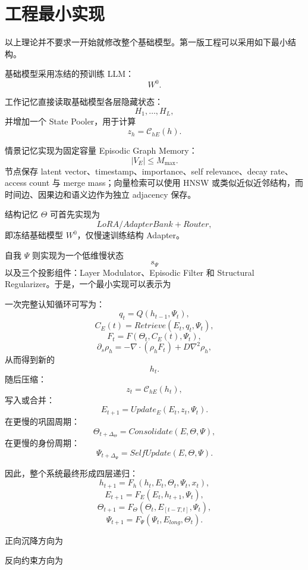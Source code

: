 \section{工程最小实现}

以上理论并不要求一开始就修改整个基础模型。第一版工程可以采用如下最小结构。

基础模型采用冻结的预训练 LLM：
\[
W^0.
\]

工作记忆直接读取基础模型各层隐藏状态：
\[
H_1,\ldots,H_L,
\]
并增加一个 State Pooler，用于计算
\[
z_h
=
\mathcal{C}_{hE}(h).
\]

情景记忆实现为固定容量 Episodic Graph Memory：
\[
|V_E|
\leq
M_{\max}.
\]
节点保存 latent vector、timestamp、importance、self relevance、decay rate、access count 与 merge mass；向量检索可以使用 HNSW 或类似近似近邻结构，而时间边、因果边和语义边作为独立 adjacency 保存。

结构记忆 $\Theta$ 可首先实现为
\[
LoRA/AdapterBank+Router,
\]
即冻结基础模型 $W^0$，仅慢速训练结构 Adapter。

自我 $\Psi$ 则实现为一个低维慢状态
\[
s_\Psi
\]
以及三个投影组件：Layer Modulator、Episodic Filter 和 Structural Regularizer。于是，一个最小实现可以表示为
\begin{statementbox}
\centering
{}
\end{statementbox}

一次完整认知循环可写为：
\[
q_t
=
Q
\left(
h_{t-1},\Psi_t
\right),
\]
\[
C_E(t)
=
Retrieve
\left(
E_t,q_t,\Psi_t
\right),
\]
\[
F_t
=
F
\left(
\Theta_t,C_E(t),\Psi_t
\right),
\]
\[
\partial_s\rho_h
=
-\nabla\cdot
\left(
\rho_hF_t
\right)
+
D\nabla^2\rho_h,
\]
从而得到新的
\[
h_t.
\]
随后压缩：
\[
z_t
=
\mathcal{C}_{hE}
\left(
h_t
\right),
\]
写入或合并：
\[
E_{t+1}
=
Update_E
\left(
E_t,z_t,\Psi_t
\right).
\]
在更慢的巩固周期：
\[
\Theta_{t+\Delta_\Theta}
=
Consolidate
\left(
E,\Theta,\Psi
\right),
\]
在更慢的身份周期：
\[
\Psi_{t+\Delta_\Psi}
=
SelfUpdate
\left(
E,\Theta,\Psi
\right).
\]

因此，整个系统最终形成四层递归：
\[
h_{t+1}
=
F_h
\left(
h_t,E_t,\Theta_t,\Psi_t,x_t
\right),
\]
\[
E_{t+1}
=
F_E
\left(
E_t,h_{t+1},\Psi_t
\right),
\]
\[
\Theta_{t+1}
=
F_\Theta
\left(
\Theta_t,E_{[t-T,t]},\Psi_t
\right),
\]
\[
\Psi_{t+1}
=
F_\Psi
\left(
\Psi_t,E_{long},\Theta_t
\right).
\]

正向沉降方向为
\begin{statementbox}
\centering
{}
\end{statementbox}
反向约束方向为
\begin{statementbox}
\centering
{}
\end{statementbox}

